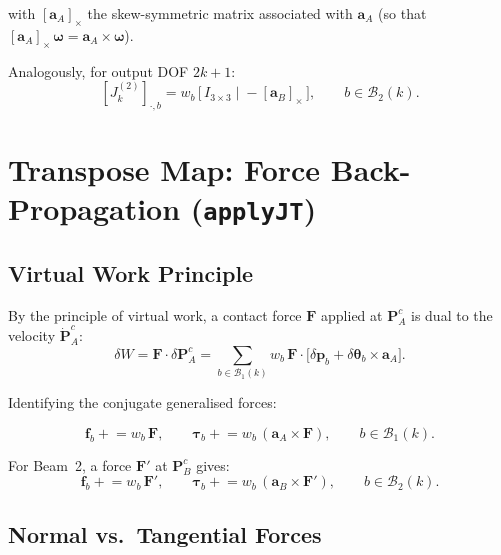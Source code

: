 \documentclass[11pt, a4paper]{article}
\newcommand{\vv}[1]{\bm{#1}}
\begin{document}
with $[\vv{a}_A]_\times$ the skew-symmetric matrix associated with
$\vv{a}_A$ (so that $[\vv{a}_A]_\times\,\bm{\omega} = \vv{a}_A \times \bm{\omega}$).

Analogously, for output DOF $2k+1$:
\begin{equation}
  \left[J^{(2)}_k\right]_{\cdot,b}
  = w_b\,\bigl[\,I_{3\times 3}\;\Big|\; -[\vv{a}_B]_\times\,\bigr],
  \qquad b \in \mathcal{B}_2(k).
  \label{eq:Jblock2}
\end{equation}

\section{Transpose Map: Force Back-Propagation (\texttt{applyJT})}
\label{sec:applyJT}

\subsection{Virtual Work Principle}

By the principle of virtual work, a contact force $\vv{F}$ applied at
$\vv{P}^c_A$ is dual to the velocity $\dot{\vv{P}}^c_A$:
\begin{equation}
  \delta W = \vv{F} \cdot \delta\vv{P}^c_A
           = \sum_{b \in \mathcal{B}_1(k)}
             w_b\,\vv{F} \cdot \bigl[\delta\vv{p}_b
             + \delta\bm{\theta}_b \times \vv{a}_A\bigr].
  \label{eq:virtualwork}
\end{equation}

Identifying the conjugate generalised forces:

\begin{equation}
  \boxed{
  \vv{f}_b \mathrel{+}= w_b\,\vv{F},
  \qquad
  \bm{\tau}_b \mathrel{+}= w_b\,(\vv{a}_A \times \vv{F}),
  \qquad b \in \mathcal{B}_1(k).
  }
  \label{eq:Jt1}
\end{equation}

For Beam~2, a force $\vv{F}'$ at $\vv{P}^c_B$ gives:
\begin{equation}
  \boxed{
  \vv{f}_b \mathrel{+}= w_b\,\vv{F}',
  \qquad
  \bm{\tau}_b \mathrel{+}= w_b\,(\vv{a}_B \times \vv{F}'),
  \qquad b \in \mathcal{B}_2(k).
  }
  \label{eq:Jt2}
\end{equation}

\subsection{Normal vs.\ Tangential Forces}
\end{document}
